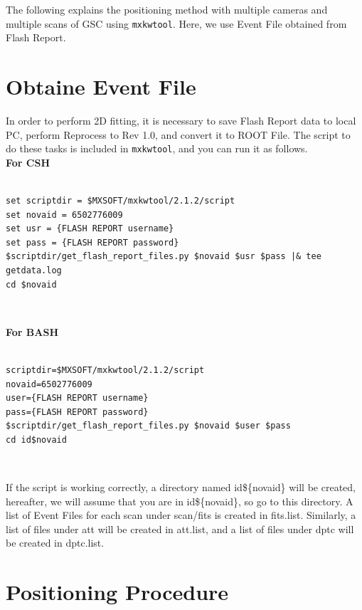 \documentclass[10pt]{report}
\renewcommand{\_}{\textscale{.5}{\textbf{\textunderscore}}}
\begin{document}
The following explains the positioning method with multiple cameras and multiple scans of GSC using \texttt{mxkwtool}. Here, we use Event File obtained from Flash Report. \\

\section{Obtaine Event File}\label{appsec:3.1}

In order to perform 2D fitting, it is necessary to save Flash Report data to local PC, perform Reprocess to Rev 1.0, and convert it to ROOT File. The script to do these tasks is included in \texttt{mxkwtool}, and you can run it as follows. \\

\noindent\textbf{For CSH} \\

\begin{lstlisting}[frame=single]

set scriptdir = $MXSOFT/mxkwtool/2.1.2/script
set novaid = 6502776009
set usr = {FLASH REPORT username}
set pass = {FLASH REPORT password}
$scriptdir/get_flash_report_files.py $novaid $usr $pass |& tee getdata.log
cd $novaid

\end{lstlisting}

\

\noindent\textbf{For BASH} \\

\begin{lstlisting}[frame=single]

scriptdir=$MXSOFT/mxkwtool/2.1.2/script
novaid=6502776009
user={FLASH REPORT username}
pass={FLASH REPORT password}
$scriptdir/get_flash_report_files.py $novaid $user $pass
cd id$novaid

\end{lstlisting}

\

If the script is working correctly, a directory named id\$\{novaid\} will be created, hereafter, we will assume that you are in id\$\{novaid\}, so go to this directory. A list of Event Files for each scan under scan/fits is created in fits.list. Similarly, a list of files under att will be created in att.list, and a list of files under dptc will be created in dptc.list. \\

\section{Positioning Procedure}\label{appsec:3.2}
\end{document}
